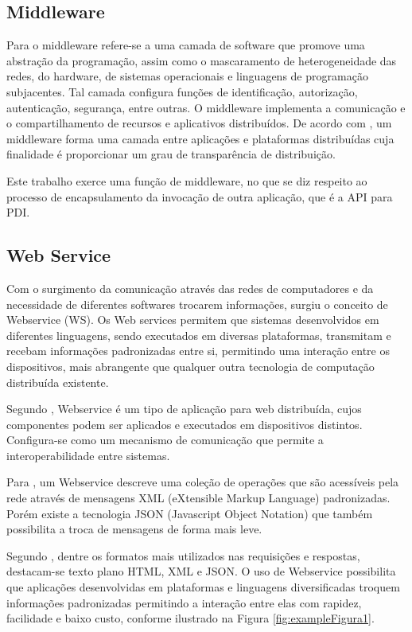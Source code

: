 \documentclass[12pt]{article}
\begin{document}
\subsection{Middleware}

Para \cite{coulouris:05} o middleware refere-se a uma camada de software
que promove uma abstração da programação, assim como o mascaramento de
heterogeneidade das redes, do hardware, de sistemas operacionais e linguagens de
programação subjacentes. Tal camada configura funções de identificação, autorização,
autenticação, segurança, entre outras. O middleware implementa a comunicação e o
compartilhamento de recursos e aplicativos distribuídos.
De acordo com \cite{tanenbaum:07}, um middleware forma uma camada entre aplicações e plataformas distribuídas
cuja finalidade é proporcionar um grau de transparência de distribuição. 

Este trabalho exerce uma função de middleware, no que se diz respeito ao processo de encapsulamento da invocação de outra aplicação, que é a API para PDI.

\subsection{Web Service}

Com o surgimento da comunicação através das redes de computadores e da necessidade
de diferentes softwares trocarem informações, surgiu o conceito de Webservice (WS).
Os Web services permitem que sistemas desenvolvidos em diferentes linguagens,
sendo executados em diversas plataformas, transmitam e recebam informações
padronizadas entre si, permitindo uma interação entre os dispositivos, mais abrangente
que qualquer outra tecnologia de computação distribuída existente.

Segundo \cite{kalin:09}, Webservice é um tipo de aplicação para web distribuída,
cujos componentes podem ser aplicados e executados em dispositivos distintos.
Configura-se como um mecanismo de comunicação que permite a interoperabilidade
entre sistemas. 

Para \cite{kreger:01}, um Webservice descreve uma coleção de operações
que são acessíveis pela rede através de mensagens XML (eXtensible Markup Language)
padronizadas. Porém existe a tecnologia JSON (Javascript Object Notation) que
também possibilita a troca de mensagens de forma mais leve. 

Segundo \cite{sandoval:09}, dentre os
formatos mais utilizados nas requisições e respostas, destacam-se texto plano
HTML, XML e JSON. O uso de Webservice
possibilita que aplicações desenvolvidas em plataformas e linguagens diversificadas
troquem informações padronizadas permitindo a interação entre elas com rapidez,
facilidade e baixo custo, conforme ilustrado na Figura \ref{fig:exampleFigura1}.
\end{document}
